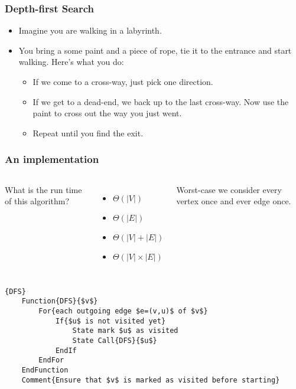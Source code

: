 \begin{frame}
	\frametitle{Depth-first Search}

			\begin{itemize}
				\item Imagine you are walking in a labyrinth.
							\item 	You bring a some paint and a piece of rope, tie it to the entrance and start walking. Here's what you do:
			
			\begin{itemize}
				\item If we come to a cross-way, just pick one direction.
					
				\item If we get to a dead-end, we back up to the last cross-way. Now use the paint to cross out the way you just
					went.
					
				\item Repeat until you find the exit.
			\end{itemize}
		\end{itemize}	
	
\end{frame}


\begin{frame}[fragile]
	\frametitle{An implementation}
	

	
	\begin{columns}[T]
		What is the run time of this algorithm?
		\begin{itemize}
			\item $\Theta(|V|)$
			\item $\Theta(|E|)$
			\item $\Theta(|V| + |E|)$
			\item $\Theta(|V|\times|E|)$
		\end{itemize}
		
			Worst-case we consider every vertex once and ever edge once.
	\end{columns}
	
	\begin{lstlisting}{DFS}
	Function{DFS}{$v$}
		For{each outgoing edge $e=(v,u)$ of $v$}
			If{$u$ is not visited yet}
				State mark $u$ as visited
				State Call{DFS}{$u$}
			EndIf
		EndFor
	EndFunction
	Comment{Ensure that $v$ is marked as visited before starting}
\end{lstlisting}
\end{frame}

